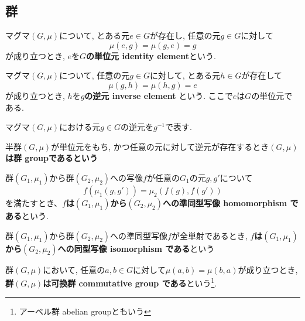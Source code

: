 \subsection{群}
\begin{Def}
マグマ$(G,\mu)$について, とある元$e\in G$が存在し, 任意の元$g\in G$に対して\[\mu(e,g)=\mu(g,e)=g\]が成り立つとき, $e$を{\bf $G$の単位元 identity element}という.
\end{Def}
\begin{Def}
マグマ$(G,\mu)$について, 任意の元$g\in G$に対して, とある元$h\in G$が存在して \[\mu(g,h)=\mu(h,g)=e\]が成り立つとき, $h$を{\bf $g$の逆元 inverse element }という.
ここで$e$は$G$の単位元である.
\end{Def}
\begin{Notation}
マグマ$(G,\mu)$における元$g\in G$の逆元を$g^{-1}$で表す.
\end{Notation}
\begin{Def}
半群$(G,\mu)$が単位元をもち, かつ任意の元に対して逆元が存在するとき\bf{$(G,\mu)$は群 groupである}という
\end{Def}
\begin{Def}
群$(G_1,\mu_1)$から群$(G_2,\mu_2)$への写像$f$が任意の$G_1$の元$g, g'$について \[f(\mu_1(g,g')) = \mu_2(f(g),f(g'))\] を満たすとき、{\bf $f$は$(G_1,\mu_1)$から$(G_2,\mu_2)$への準同型写像 homomorphism である}という.
\end{Def}
\begin{Def}
群$(G_1,\mu_1)$から群$(G_2,\mu_2)$への準同型写像$f$が全単射であるとき,
{\bf $f$は$(G_1,\mu_1)$から$(G_2,\mu_2)$への同型写像 isomorphism である}という
\end{Def}
\begin{Def}
群$(G,\mu)$において,
任意の$a,b\in G$に対して$\mu(a,b)=\mu(b,a)$が成り立つとき,
{\bf 群$(G,\mu)$は可換群 commutative group である}という\footnote{アーベル群 abelian groupともいう}.
\end{Def}
\begin{comment}
\begin{Def}
位相空間$X$と自然数$n$に対して次の手続きで決定されるアーベル群$H_n(X)$を{\bf$n$次 ホモロジー群}と呼ぶ

...

\end{Def}
\end{comment}

